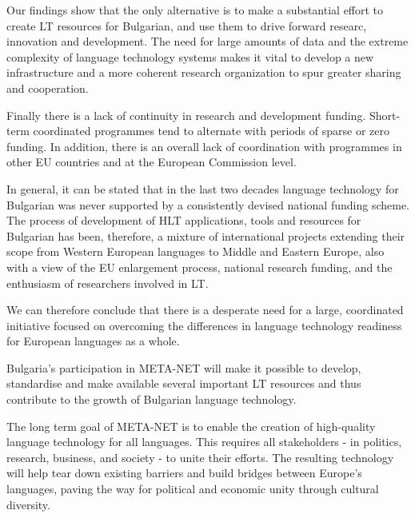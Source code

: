 \documentclass[]{../../metanetpaper}
\begin{document}
\begin{multicols}{2}
Our findings show that the only alternative is to make a substantial effort to create LT resources for Bulgarian, and use them to drive forward researc, innovation and development. The need for large amounts of data and the extreme complexity of language technology systems makes it vital to develop a new infrastructure and a more coherent research organization to spur greater sharing and cooperation.

Finally there is a lack of continuity in research and development funding. Short-term coordinated programmes tend to alternate with periods of sparse or zero funding. In addition, there is an overall lack of coordination with programmes in other EU countries and at the European Commission level.

In general, it can be stated that in the last two decades language technology for Bulgarian was never supported by a consistently devised national funding scheme. The process of development of HLT applications, tools and resources for Bulgarian has been, therefore, a mixture of international projects extending their scope from Western European languages to Middle and Eastern Europe, also with a view of the EU enlargement process, national research funding, and the enthusiasm of researchers involved in LT.

We can therefore conclude that there is a desperate need for a large, coordinated initiative focused on overcoming the differences in language technology readiness for European languages as a whole. 

Bulgaria’s participation in
META-NET will make it possible to develop, standardise and make
available several important LT resources and thus contribute to the
growth of Bulgarian language technology.

The long term goal of META-NET is to enable the creation of high-quality language technology for all languages. This requires all stakeholders - in politics, research, business, and society - to unite their efforts. The resulting technology will help tear down existing barriers and build bridges between Europe’s languages, paving the way for political and economic unity through cultural diversity. 
\end{multicols}

\clearpage
\end{document}
